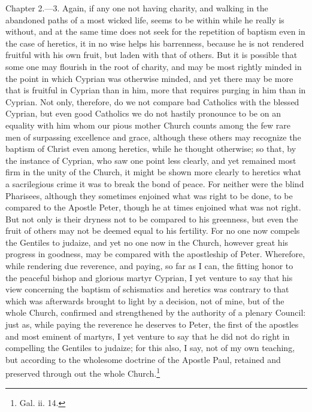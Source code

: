 Chapter 2.—3. Again, if any one not having charity, and walking in the abandoned paths of a most wicked life, seems to be within while he really is without, and at the same time does not seek for the repetition of baptism even in the case of heretics, it in no wise helps his barrenness, because he is not rendered fruitful with his own fruit, but laden with that of others. But it is possible that some one may flourish in the root of charity, and may be most rightly minded in the point in which Cyprian was otherwise minded, and yet there may be more that is fruitful in Cyprian than in him, more that requires purging in him than in Cyprian. Not only, therefore, do we not compare bad Catholics with the blessed Cyprian, but even good Catholics we do not hastily pronounce to be on an equality with him whom our pious mother Church counts among the few rare men of surpassing excellence and grace, although these others may recognize the baptism of Christ even among heretics, while he thought otherwise; so that, by the instance of Cyprian, who saw one point less clearly, and yet remained most firm in the unity of the Church, it might be shown more clearly to heretics what a sacrilegious crime it was to break the bond of peace. For neither were the blind Pharisees, although they sometimes enjoined what was right to be done, to be compared to the Apostle Peter, though he at times enjoined what was not right. But not only is their dryness not to be compared to his greenness, but even the fruit of others may not be deemed equal to his fertility. For no one now compels the Gentiles to judaize, and yet no one now in the Church, however great his progress in goodness, may be compared with the apostleship of Peter. Wherefore, while rendering due reverence, and paying, so far as I can, the fitting honor to the peaceful bishop and glorious martyr Cyprian, I yet venture to say that his view concerning the baptism of schismatics and heretics was contrary to that which was afterwards brought to light by a decision, not of mine, but of the whole Church, confirmed and strengthened by the authority of a plenary Council: just as, while paying the reverence he deserves to Peter, the first of the apostles and most eminent of martyrs, I yet venture to say that he did not do right in compelling the Gentiles to judaize; for this also, I say, not of my own teaching, but according to the wholesome doctrine of the Apostle Paul, retained and preserved through out the whole Church.\footnote{\par  Gal. ii. 14.}

